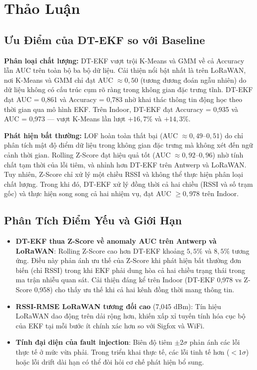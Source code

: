 \documentclass[12pt,a4paper]{article}
\begin{document}
\section{Thảo Luận}

\subsection{Ưu Điểm của DT-EKF so với Baseline}

\textbf{Phân loại chất lượng:} DT-EKF vượt trội K-Means và GMM về cả
Accuracy lẫn AUC trên toàn bộ ba bộ dữ liệu. Cải thiện nổi bật nhất là
trên LoRaWAN, nơi K-Means và GMM chỉ đạt AUC $\approx 0{,}50$ (tương đương
đoán ngẫu nhiên) do dữ liệu không có cấu trúc cụm rõ ràng trong không gian
đặc trưng tĩnh. DT-EKF đạt AUC = 0,861 và Accuracy = 0,783 nhờ khai thác
thông tin động học theo thời gian qua mô hình EKF. Trên Indoor, DT-EKF đạt
Accuracy = 0,935 và AUC = 0,973 — vượt K-Means lần lượt $+16{,}7\%$ và
$+14{,}3\%$.

\textbf{Phát hiện bất thường:} LOF hoàn toàn thất bại (AUC $\approx 0{,}49$--$0{,}51$)
do chỉ phân tích mật độ điểm dữ liệu trong không gian đặc trưng mà không
xét đến ngữ cảnh thời gian. Rolling Z-Score đạt hiệu quả tốt (AUC
$\approx 0{,}92$--$0{,}96$) nhờ tính chất tạm thời của lỗi tiêm, và nhỉnh
hơn DT-EKF trên Antwerp và LoRaWAN. Tuy nhiên, Z-Score chỉ xử lý một chiều
RSSI và không thể thực hiện phân loại chất lượng. Trong khi đó, DT-EKF
xử lý đồng thời cả hai chiều (RSSI và số trạm gốc) và thực hiện song song
cả hai nhiệm vụ, đạt AUC $\geq 0{,}978$ trên Indoor.

\subsection{Phân Tích Điểm Yếu và Giới Hạn}

\begin{itemize}
    \item \textbf{DT-EKF thua Z-Score về anomaly AUC trên Antwerp và LoRaWAN}:
    Rolling Z-Score cao hơn DT-EKF khoảng $5{,}5\%$ và $8{,}5\%$ tương ứng.
    Điều này phản ánh ưu thế của Z-Score khi phát hiện bất thường đơn biến
    (chỉ RSSI) trong khi EKF phải dung hòa cả hai chiều trạng thái trong
    ma trận nhiễu quan sát. Cải thiện đáng kể trên Indoor (DT-EKF 0,978 vs
    Z-Score 0,958) cho thấy ưu thế khi cả hai kênh đồng thời mang thông tin.

    \item \textbf{RSSI-RMSE LoRaWAN tương đối cao} (7,045 dBm): Tín hiệu
    LoRaWAN dao động trên dải rộng hơn, khiến xấp xỉ tuyến tính hóa cục bộ
    của EKF tại mỗi bước ít chính xác hơn so với Sigfox và WiFi.

    \item \textbf{Tính đại diện của fault injection}: Biên độ tiêm $\pm 2\sigma$
    phản ánh các lỗi thực tế ở mức vừa phải. Trong triển khai thực tế, các
    lỗi tinh tế hơn ($< 1\sigma$) hoặc lỗi drift dài hạn có thể đòi hỏi
    cơ chế phát hiện bổ sung.
\end{itemize}
\end{document}
